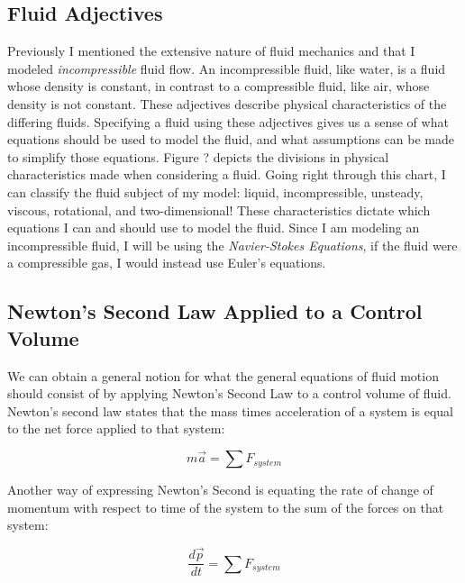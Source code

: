 \documentclass[twocolumn,12pth]{article}
\begin{document}
\subsection{Fluid Adjectives}

Previously I mentioned the extensive nature of fluid mechanics and that I modeled \textit{incompressible} fluid flow.
An incompressible fluid, like water, is a fluid whose density is constant, in contrast to a compressible fluid, like air, whose density is not constant.
These adjectives describe physical characteristics of the differing fluids.
Specifying a fluid using these adjectives gives us a sense of what equations should be used to model the fluid, and what assumptions can be made to simplify those equations.
Figure ? depicts the divisions in physical characteristics made when considering a fluid.
Going right through this chart, I can classify the fluid subject of my model: liquid, incompressible, unsteady, viscous, rotational, and two-dimensional!
These characteristics dictate which equations I can and should use to model the fluid.
Since I am modeling an incompressible fluid, I will be using the \textit{Navier-Stokes Equations}, if the fluid were a compressible gas, I would instead use Euler's equations.

\subsection{Newton's Second Law Applied to a Control Volume}

We can obtain a general notion for what the general equations of fluid motion should consist of by applying Newton's Second Law to a control volume of fluid.
Newton's second law states that the mass times acceleration of a system is equal to the net force applied to that system:

\begin{equation*}
m\vec{a} = \sum{F_{system}}
\end{equation*}

Another way of expressing Newton's Second is equating the rate of change of momentum with respect to time of the system to the sum of the forces on that system:

\begin{equation}
\frac{d{\vec{p}}}{dt} = \sum F_{system}
\end{equation}
\end{document}
